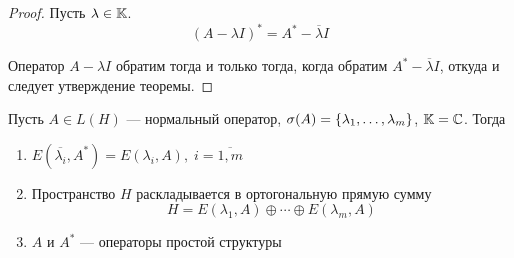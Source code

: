 \begin{proof}
    Пусть $\lambda \in \mathbb{K}$.
    \[ (A - \lambda I)^* = A^* - \overline{\lambda} I \]
    
    Оператор $A - \lambda I$ обратим тогда и только тогда, когда обратим $A^* -
    \overline{\lambda}I$, откуда и следует утверждение теоремы.
\end{proof}

\begin{theorem}
    Пусть $A \in L(H)$ — нормальный оператор, $\operatorname{\sigma}(A) = \left\{\lambda_1,
    \dotsc, \lambda_m\right\}$, $\mathbb{K} = \mathbb{C}$. Тогда
    \begin{enumerate}
        \item $E(\overline{\lambda_i}, A^*) = E(\lambda_i, A), \; i =
            \overline{1,m}$
        \item Пространство $H$ раскладывается в ортогональную прямую сумму
            \[ H = E(\lambda_1, A) \oplus \dotsb \oplus E(\lambda_m, A) \]
        \item $A$ и $A^*$ — операторы простой структуры
    \end{enumerate}
\end{theorem}

